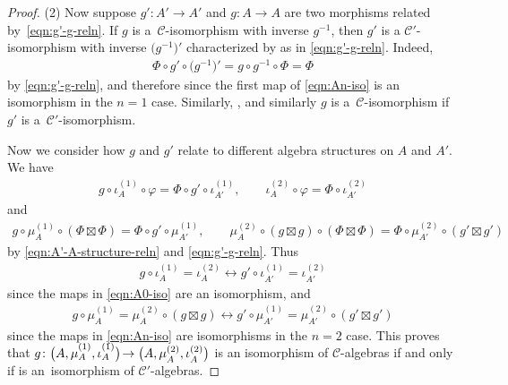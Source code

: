 \documentclass[pdftex]{sigma}
\numberwithin{equation}{section}
\theoremstyle{definition}
\begin{document}
\begin{proof}
(2) Now suppose $g'\colon A'\rightarrow A'$ and $g\colon A\rightarrow A$ are two morphisms related by~\eqref{eqn:g'-g-reln}. If $g$ is a~$\mathcal{C}$-isomorphism with inverse $g^{-1}$, then $g'$ is a $\mathcal{C}'$-isomorphism with inverse $\bigl(g^{-1}\bigr)'$ characterized by  as in \eqref{eqn:g'-g-reln}. Indeed,
\begin{gather*}
\Phi\circ g'\circ\bigl(g^{-1}\bigr)' =g\circ g^{-1}\circ\Phi =\Phi
\end{gather*}
by \eqref{eqn:g'-g-reln}, and therefore  since the first map of \eqref{eqn:An-iso} is an isomorphism in the $n=1$ case. Similarly, , and similarly $g$ is a~$\mathcal{C}$-isomorphism if $g'$ is a~$\mathcal{C}'$-isomorphism.

Now we consider how $g$ and $g'$ relate to different algebra structures on $A$ and $A'$. We have
\begin{gather*}
g\circ\iota^{(1)}_A\circ\varphi =\Phi\circ g'\circ\iota_{A'}^{(1)},\qquad \iota_{A}^{(2)}\circ\varphi =\Phi\circ\iota_{A'}^{(2)}
\end{gather*}
and
\begin{gather*}
g\circ\mu_A^{(1)}\circ(\Phi\boxtimes\Phi) =\Phi\circ g'\circ\mu_{A'}^{(1)},\qquad \mu_{A}^{(2)}\circ(g\boxtimes g)\circ(\Phi\boxtimes\Phi) =\Phi\circ\mu_{A'}^{(2)}\circ(g'\boxtimes g')
\end{gather*}
by \eqref{eqn:A'-A-structure-reln} and \eqref{eqn:g'-g-reln}. Thus
\begin{gather*}
g\circ\iota_A^{(1)}=\iota_A^{(2)}\longleftrightarrow g'\circ\iota_{A'}^{(1)} =\iota_{A'}^{(2)}
\end{gather*}
since the maps in \eqref{eqn:A0-iso} are an isomorphism, and
\begin{gather*}
g\circ\mu_A^{(1)}=\mu_A^{(2)}\circ(g\boxtimes g) \longleftrightarrow g'\circ\mu_{A'}^{(1)}=\mu_{A'}^{(2)}\circ(g'\boxtimes g')
\end{gather*}
since the maps in \eqref{eqn:An-iso} are isomorphisms in the $n=2$ case.
This proves that $g\colon \smash{\bigl(A,\mu\raisebox{1pt}{${}_A^{(1)}$},\iota\raisebox{1pt}{${}_A^{(1)}$}\bigr)}\!\rightarrow \smash{\bigl(A,\mu\raisebox{-1pt}{${}_A^{(2)}$}, \iota\raisebox{-1pt}{${}_A^{(2)}$}\bigr)}$ is an isomorphism of $\mathcal{C}$-algebras if and only if  is an~isomorphism of $\mathcal{C}'$-algebras.
\end{proof}
\end{document}
